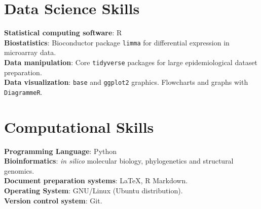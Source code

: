 \documentclass[margin,line]{res}
\begin{document}
\begin{resume}
\section{\sc Data Science Skills}%
{\bf Statistical computing software}: R\\ %
{\bf Biostatistics}: Bioconductor package \texttt{limma} for differential expression in microarray data.\\ 
{\bf Data manipulation}: Core \texttt{tidyverse} packages for large epidemiological dataset preparation.\\
{\bf Data visualization}: \texttt{base} and \texttt{ggplot2} graphics. Flowcharts and graphs with \texttt{DiagrammeR}.\\ 

\section{\sc Computational Skills}
{\bf Programming Language}: Python\\%
{\bf Bioinformatics}: \textit{in silico} molecular biology, phylogenetics and structural genomics.\\
{\bf Document preparation systems}: LaTeX, R Markdown.\\ 
{\bf Operating System}: GNU/Linux (Ubuntu distribution).\\ %
{\bf Version control system}: Git.\\ %


\end{resume}
\end{document}
